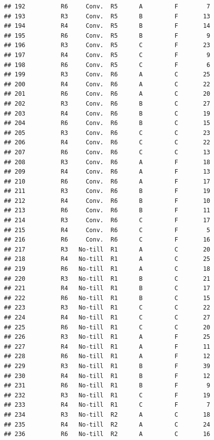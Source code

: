 \documentclass[
]{article}
\begin{document}
\begin{verbatim}
## 192          R6     Conv.  R5      A         F        7
## 193          R3     Conv.  R5      B         F       13
## 194          R4     Conv.  R5      B         F       14
## 195          R6     Conv.  R5      B         F        9
## 196          R3     Conv.  R5      C         F       23
## 197          R4     Conv.  R5      C         F        9
## 198          R6     Conv.  R5      C         F        6
## 199          R3     Conv.  R6      A         C       25
## 200          R4     Conv.  R6      A         C       22
## 201          R6     Conv.  R6      A         C       20
## 202          R3     Conv.  R6      B         C       27
## 203          R4     Conv.  R6      B         C       19
## 204          R6     Conv.  R6      B         C       15
## 205          R3     Conv.  R6      C         C       23
## 206          R4     Conv.  R6      C         C       22
## 207          R6     Conv.  R6      C         C       13
## 208          R3     Conv.  R6      A         F       18
## 209          R4     Conv.  R6      A         F       13
## 210          R6     Conv.  R6      A         F       17
## 211          R3     Conv.  R6      B         F       19
## 212          R4     Conv.  R6      B         F       10
## 213          R6     Conv.  R6      B         F       11
## 214          R3     Conv.  R6      C         F       17
## 215          R4     Conv.  R6      C         F        5
## 216          R6     Conv.  R6      C         F       16
## 217          R3   No-till  R1      A         C       20
## 218          R4   No-till  R1      A         C       25
## 219          R6   No-till  R1      A         C       18
## 220          R3   No-till  R1      B         C       21
## 221          R4   No-till  R1      B         C       17
## 222          R6   No-till  R1      B         C       15
## 223          R3   No-till  R1      C         C       22
## 224          R4   No-till  R1      C         C       27
## 225          R6   No-till  R1      C         C       20
## 226          R3   No-till  R1      A         F       25
## 227          R4   No-till  R1      A         F       11
## 228          R6   No-till  R1      A         F       12
## 229          R3   No-till  R1      B         F       39
## 230          R4   No-till  R1      B         F       12
## 231          R6   No-till  R1      B         F        9
## 232          R3   No-till  R1      C         F       19
## 233          R4   No-till  R1      C         F        7
## 234          R3   No-till  R2      A         C       18
## 235          R4   No-till  R2      A         C       24
## 236          R6   No-till  R2      A         C       16

\end{verbatim}
\end{document}
